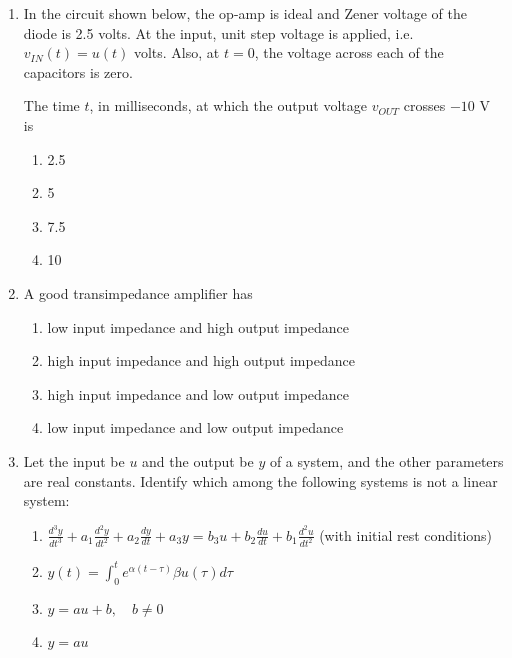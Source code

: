\documentclass{article}
\begin{document}
\begin{enumerate}
\item In the circuit shown below, the op-amp is ideal and Zener voltage of the diode is 2.5 volts. At the input, unit step voltage is applied, i.e. $v_{IN}(t) = u(t)$ volts. Also, at $t = 0$, the voltage across each of the capacitors is zero.
\begin{figure}[H]
    \centering
    
    \caption{}
    \label{fig:q12}
\end{figure}
The time $t$, in milliseconds, at which the output voltage $v_{OUT}$ crosses $-10$ V is
\begin{multicols}{4}
\begin{enumerate}
\item 2.5
\item 5
\item 7.5
\item 10
\end{enumerate}
\end{multicols}

\item A good transimpedance amplifier has
\begin{multicols}{2}
\begin{enumerate}
\item low input impedance and high output impedance
\item high input impedance and high output impedance
\item high input impedance and low output impedance
\item low input impedance and low output impedance
\end{enumerate}
\end{multicols}

\item Let the input be $u$ and the output be $y$ of a system, and the other parameters are real constants. Identify which among the following systems is not a linear system:
\begin{enumerate}
\item $\frac{d^3y}{dt^3} + a_1 \frac{d^2y}{dt^2} + a_2 \frac{dy}{dt} + a_3 y = b_3 u + b_2 \frac{du}{dt} + b_1 \frac{d^2u}{dt^2}$ (with initial rest conditions)
\item $y(t) = \int_{0}^{t} e^{\alpha(t-\tau)} \beta u(\tau) d\tau$
\item $y = au + b, \quad b \neq 0$
\item $y = au$
\end{enumerate}


\end{enumerate}
\end{document}
